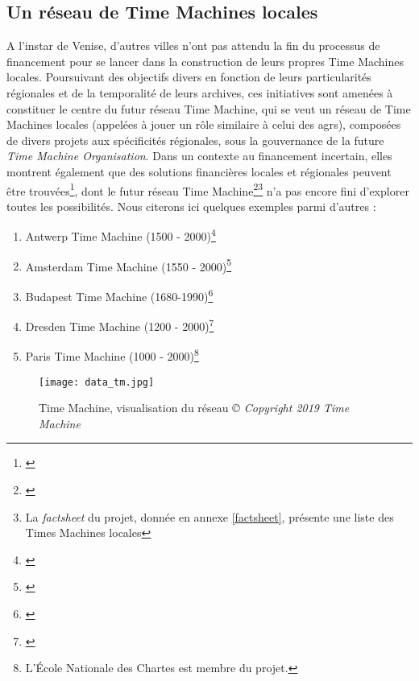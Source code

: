 \subsection{Un réseau de Time Machines locales}
A l'instar de Venise, d'autres villes n'ont pas attendu la fin du processus de financement pour se lancer dans la construction de leurs propres Time Machines locales. Poursuivant des objectifs divers en fonction de leurs particularités régionales et de la temporalité de leurs archives, ces initiatives sont amenées à constituer le centre du futur réseau Time Machine, qui se veut un réseau de Time Machines locales (appelées à jouer un rôle similaire à celui des \gls{agr}s),  composées de divers projets aux spécificités régionales, sous la gouvernance de la future \textit{Time Machine Organisation}. Dans un contexte au financement incertain, elles montrent également que des solutions financières locales et régionales peuvent être trouvées\footnote{\cite{rts_coup_2019}}, dont le futur réseau Time Machine\footnote{\cite{time_machine_local_nodate}}\footnote{La \textit{factsheet} du projet, donnée en annexe \ref{factsheet}, présente une liste des Times Machines locales} n'a pas encore fini d'explorer toutes les possibilités. Nous citerons ici quelques exemples parmi d'autres : 
\begin{enumerate}
\item Antwerp Time Machine (1500 - 2000)\footnote{\cite{university_of_antwerp_antwerp_nodate}}
\item Amsterdam Time Machine (1550 - 2000)\footnote{\cite{amsterdam_time_machine_amsterdam_nodate}}
\item Budapest Time Machine (1680-1990)\footnote{\cite{hungaricana_budapest_nodate}}
\item Dresden Time Machine (1200 - 2000)\footnote{\cite{noauthor_dresden_nodate}}
\item Paris Time Machine (1000 - 2000)\footnote{L'École Nationale des Chartes est membre du projet.}
\end{enumerate}

\begin{figure}[H]%
\centering
\texttt{[image: data\_tm.jpg]}
\caption{Time Machine, visualisation du réseau \textit{© Copyright 2019 Time Machine}}
\end{figure}

